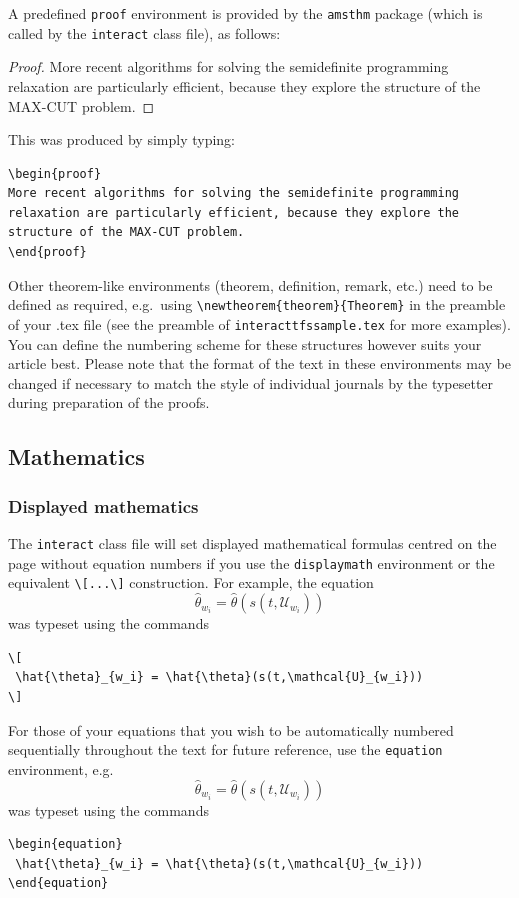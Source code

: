 \documentclass[]{interact}
\theoremstyle{plain}%
\theoremstyle{definition}
\theoremstyle{remark}
\begin{document}
A predefined \verb"proof" environment is provided by the \texttt{amsthm} package (which is called by the \texttt{interact} class file), as follows:
\begin{proof}
More recent algorithms for solving the semidefinite programming relaxation are particularly efficient, because they explore the structure of the MAX-CUT problem.
\end{proof}
\noindent This was produced by simply typing:
\begin{verbatim}
\begin{proof}
More recent algorithms for solving the semidefinite programming
relaxation are particularly efficient, because they explore the
structure of the MAX-CUT problem.
\end{proof}
\end{verbatim}
Other theorem-like environments (theorem, definition, remark, etc.) need to be defined as required, e.g.\ using \verb"\newtheorem{theorem}{Theorem}" in the preamble of your .tex file (see the preamble of \verb"interacttfssample.tex" for more examples). You can define the numbering scheme for these structures however suits your article best. Please note that the format of the text in these environments may be changed if necessary to match the style of individual journals by the typesetter during preparation of the proofs.


\subsection{Mathematics}

\subsubsection{Displayed mathematics}

The \texttt{interact} class file will set displayed mathematical formulas centred on the page without equation numbers if you use the \texttt{displaymath} environment or the equivalent \verb"\[...\]" construction. For example, the equation
\[
 \hat{\theta}_{w_i} = \hat{\theta}(s(t,\mathcal{U}_{w_i}))
\]
was typeset using the commands
\begin{verbatim}
\[
 \hat{\theta}_{w_i} = \hat{\theta}(s(t,\mathcal{U}_{w_i}))
\]
\end{verbatim}

For those of your equations that you wish to be automatically numbered sequentially throughout the text for future reference, use the \texttt{equation} environment, e.g.
\begin{equation}
 \hat{\theta}_{w_i} = \hat{\theta}(s(t,\mathcal{U}_{w_i}))
\end{equation}
was typeset using the commands
\begin{verbatim}
\begin{equation}
 \hat{\theta}_{w_i} = \hat{\theta}(s(t,\mathcal{U}_{w_i}))
\end{equation}
\end{verbatim}
\end{document}
